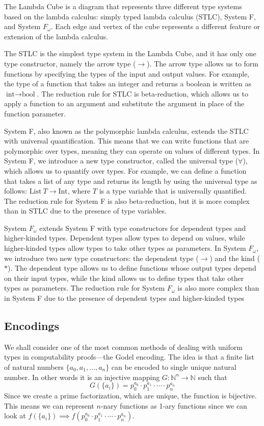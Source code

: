 \documentclass[conference]{IEEEtran}
\begin{document}
The Lambda Cube is a diagram that represents three different type systems based on the lambda calculus: simply typed lambda calculus (STLC), System F, and System $F_\omega$. Each edge and vertex of the cube represents a different feature or extension of the lambda calculus.

The STLC is the simplest type system in the Lambda Cube, and it has only one type constructor, namely the arrow type ($\to$). The arrow type allows us to form functions by specifying the types of the input and output values. For example, the type of a function that takes an integer and returns a boolean is written as $\text{int} \to \text{bool}$. The reduction rule for STLC is beta-reduction, which allows us to apply a function to an argument and substitute the argument in place of the function parameter.

System F, also known as the polymorphic lambda calculus, extends the STLC with universal quantification. This means that we can write functions that are polymorphic over types, meaning they can operate on values of different types. In System F, we introduce a new type constructor, called the universal type ($\forall$), which allows us to quantify over types. For example, we can define a function that takes a list of any type and returns its length by using the universal type as follows: $\text{List}\ T \to \text{Int}$, where $T$ is a type variable that is universally quantified. The reduction rule for System F is also beta-reduction, but it is more complex than in STLC due to the presence of type variables.

System $F_\omega$ extends System F with type constructors for dependent types and higher-kinded types. Dependent types allow types to depend on values, while higher-kinded types allow types to take other types as parameters. In System $F_\omega$, we introduce two new type constructors: the dependent type ($\rightarrow$) and the kind ($*$). The dependent type allows us to define functions whose output types depend on their input types, while the kind allows us to define types that take other types as parameters. The reduction rule for System $F_\omega$ is also more complex than in System F due to the presence of dependent types and higher-kinded types\cite{pierce2002types}

\subsection{Encodings}
We shall consider one of the most common methods of dealing with uniform types in computability proofs—the Godel encoding.
The idea is that a finite list of natural numbers $\{a_0,a_1,\ldots,a_n\}$ can be encoded to single unique natural number. In other words it is an injective mapping $G:\mathbb{N}^n\to \mathbb{N}$ such that
\begin{equation*}
    G(\{a_i\})=p_0^{a_0}\cdot p_1^{a_1}\cdot \cdots \cdot p_n^{a_n}    
\end{equation*}
Since we create a prime factorization, which are unique, the function is bijective. This means we can represent $n$-nary functions
as 1-ary functions since we can look at $f(\{a_i\})\implies f(p_0^{a_0}\cdot p_1^{a_1}\cdot \cdots \cdot p_n^{a_n})$.
\end{document}
